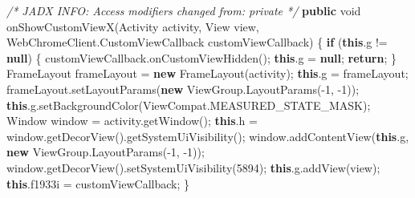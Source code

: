 \documentclass[
]{article}
\newenvironment{Shaded}{}{}
\newcommand{\BuiltInTok}[1]{\textcolor[rgb]{0.00,0.50,0.00}{#1}}
\newcommand{\CommentTok}[1]{\textcolor[rgb]{0.38,0.63,0.69}{\textit{#1}}}
\newcommand{\ControlFlowTok}[1]{\textcolor[rgb]{0.00,0.44,0.13}{\textbf{#1}}}
\newcommand{\DataTypeTok}[1]{\textcolor[rgb]{0.56,0.13,0.00}{#1}}
\newcommand{\DecValTok}[1]{\textcolor[rgb]{0.25,0.63,0.44}{#1}}
\newcommand{\FunctionTok}[1]{\textcolor[rgb]{0.02,0.16,0.49}{#1}}
\newcommand{\KeywordTok}[1]{\textcolor[rgb]{0.00,0.44,0.13}{\textbf{#1}}}
\newcommand{\NormalTok}[1]{#1}
\newcommand{\OperatorTok}[1]{\textcolor[rgb]{0.40,0.40,0.40}{#1}}
\begin{document}
\begin{Shaded}
\begin{Highlighting}[]
    \CommentTok{/* JADX INFO: Access modifiers changed from: private */}
    \KeywordTok{public} \DataTypeTok{void} \FunctionTok{onShowCustomViewX}\OperatorTok{(}\NormalTok{Activity activity}\OperatorTok{,} \BuiltInTok{View}\NormalTok{ view}\OperatorTok{,}\NormalTok{ WebChromeClient}\OperatorTok{.}\FunctionTok{CustomViewCallback}\NormalTok{ customViewCallback}\OperatorTok{)} \OperatorTok{\{}
        \ControlFlowTok{if} \OperatorTok{(}\KeywordTok{this}\OperatorTok{.}\FunctionTok{g} \OperatorTok{!=} \KeywordTok{null}\OperatorTok{)} \OperatorTok{\{}
\NormalTok{            customViewCallback}\OperatorTok{.}\FunctionTok{onCustomViewHidden}\OperatorTok{();}
            \KeywordTok{this}\OperatorTok{.}\FunctionTok{g} \OperatorTok{=} \KeywordTok{null}\OperatorTok{;}
            \ControlFlowTok{return}\OperatorTok{;}
        \OperatorTok{\}}
\NormalTok{        FrameLayout frameLayout }\OperatorTok{=} \KeywordTok{new} \FunctionTok{FrameLayout}\OperatorTok{(}\NormalTok{activity}\OperatorTok{);}
        \KeywordTok{this}\OperatorTok{.}\FunctionTok{g} \OperatorTok{=}\NormalTok{ frameLayout}\OperatorTok{;}
\NormalTok{        frameLayout}\OperatorTok{.}\FunctionTok{setLayoutParams}\OperatorTok{(}\KeywordTok{new}\NormalTok{ ViewGroup}\OperatorTok{.}\FunctionTok{LayoutParams}\OperatorTok{({-}}\DecValTok{1}\OperatorTok{,} \OperatorTok{{-}}\DecValTok{1}\OperatorTok{));}
        \KeywordTok{this}\OperatorTok{.}\FunctionTok{g}\OperatorTok{.}\FunctionTok{setBackgroundColor}\OperatorTok{(}\NormalTok{ViewCompat}\OperatorTok{.}\FunctionTok{MEASURED\_STATE\_MASK}\OperatorTok{);}
        \BuiltInTok{Window}\NormalTok{ window }\OperatorTok{=}\NormalTok{ activity}\OperatorTok{.}\FunctionTok{getWindow}\OperatorTok{();}
        \KeywordTok{this}\OperatorTok{.}\FunctionTok{h} \OperatorTok{=}\NormalTok{ window}\OperatorTok{.}\FunctionTok{getDecorView}\OperatorTok{().}\FunctionTok{getSystemUiVisibility}\OperatorTok{();}
\NormalTok{        window}\OperatorTok{.}\FunctionTok{addContentView}\OperatorTok{(}\KeywordTok{this}\OperatorTok{.}\FunctionTok{g}\OperatorTok{,} \KeywordTok{new}\NormalTok{ ViewGroup}\OperatorTok{.}\FunctionTok{LayoutParams}\OperatorTok{({-}}\DecValTok{1}\OperatorTok{,} \OperatorTok{{-}}\DecValTok{1}\OperatorTok{));}
\NormalTok{        window}\OperatorTok{.}\FunctionTok{getDecorView}\OperatorTok{().}\FunctionTok{setSystemUiVisibility}\OperatorTok{(}\DecValTok{5894}\OperatorTok{);}
        \KeywordTok{this}\OperatorTok{.}\FunctionTok{g}\OperatorTok{.}\FunctionTok{addView}\OperatorTok{(}\NormalTok{view}\OperatorTok{);}
        \KeywordTok{this}\OperatorTok{.}\FunctionTok{f1933i} \OperatorTok{=}\NormalTok{ customViewCallback}\OperatorTok{;}
    \OperatorTok{\}}


\end{Highlighting}
\end{Shaded}
\end{document}
